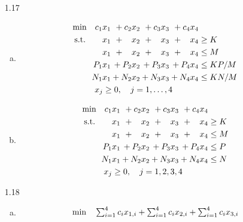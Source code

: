 \documentclass[a4paper,10pt]{article}
\theoremstyle{definition}
\begin{document}
\begin{enumerate}
\item[1.17]
\begin{enumerate}[(a)]
\item
\begin{align*}
  \begin{array}{r@{}r@{}r@{}r@{}l}
    \text{min} \quad c_1x_1 &{} + c_2x_2&{}+ c_3x_3&{}+ c_4x_4&{} \\[\jot]
    \text{s.t.}\qquad x_1 &{} +\phantom{c_2}x_2 &{} + \phantom{c_3}x_3 &{}+\phantom{c_3} x_4&{}  \geq K\\ [\jot]
    x_1 &{} +\phantom{c_2}x_2 &{} + \phantom{c_3}x_3 &{}+\phantom{c_3} x_4&{}  \leq M\\ [\jot]
P_1x_1 &{}+P_2x_2 &{}+P_3x_3 &{}+P_4x_4 &{}\leq KP/M\\        [\jot]          
N_1x_1 &{}+N_2x_2 &{}+N_3x_3 &{}+N_4x_4 &{}\leq KN/M\\    [\jot]              
 \multicolumn{4}{c}{x_j \geq 0, \quad j=1,\ldots,4}
  \end{array}
\end{align*}
\item
\begin{align*}
  \begin{array}{r@{}r@{}r@{}r@{}l}
    \text{min} \quad c_1x_1 &{} + c_2x_2&{}+ c_3x_3&{}+ c_4x_4&{} \\[\jot]
    \text{s.t.}\qquad x_1 &{} +\phantom{c_2}x_2 &{} + \phantom{c_3}x_3 &{}+\phantom{c_3} x_4&{}  \geq K\\ [\jot]
    x_1 &{} +\phantom{c_2}x_2 &{} + \phantom{c_3}x_3 &{}+\phantom{c_3} x_4&{}  \leq M\\ [\jot]
P_1x_1 &{}+P_2x_2 &{}+P_3x_3 &{}+P_4x_4 &{}\leq P\\        [\jot]          
N_1x_1 &{}+N_2x_2 &{}+N_3x_3 &{}+N_4x_4 &{}\leq N\\    [\jot]              
 \multicolumn{4}{c}{x_j \geq 0, \quad j=1,2,3,4}
  \end{array}
\end{align*}
\end{enumerate}
\item[1.18]
\begin{enumerate}[(a)]
\item
\begin{align*}
  \begin{array}{r@{}r@{}r@{}l}
    \text{min} \quad \sum_{i=1}^{4}c_ix_{1,i} &{} + \sum_{i=1}^{4}c_ix_{2,i}&{}+ \sum_{i=1}^{4}c_ix_{3,i}&{} \\[\jot]

\end{array}
\end{align*}
\end{enumerate}
\end{enumerate}
\end{document}
